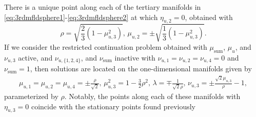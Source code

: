 There is a unique point along each of the tertiary manifolds in \eqref{eq:3rdmfldsphere1}-\eqref{eq:3rdmfldsphere2} at which $\eta_{u,2}=0$, obtained with
\begin{equation}
\rho=\sqrt{\frac{2}{3}(1-\mu_{u,3}^2)},\,\mu_{u,2}=\pm\sqrt{\frac{1}{3}(1-\mu_{u,3}^2)}.
\end{equation}
If we consider the restricted continuation problem obtained with $\mu_\mathrm{sum}$, $\mu_u$, and $\nu_{u,3}$ active, and $\nu_{u,\{1,2,4\}}$, and $\nu_\mathrm{sum}$ inactive with $\nu_{u,1}=\nu_{u,2}=\nu_{u,4}=0$ and $\nu_\mathrm{sum}=1$, then solutions are located on the one-dimensional manifolds given by
\begin{gather}
\label{eq:4rdmfldsphere1}
\mu_{u,1}=\mu_{u,2}=\mu_{u,4}=\pm\frac{\rho}{\sqrt{2}},\,\mu_{u,3}^2=1-\frac{3}{2}\rho^2,\,\lambda=\mp\frac{1}{\sqrt{2}\rho},\,\nu_{u,3}=\pm\frac{\sqrt{2}\mu_{u,3}}{\rho}-1,
\end{gather}
parameterized by $\rho$. Notably, the points along each of these manifolds with $\eta_{u,3}=0$ coincide with the stationary points found previously


